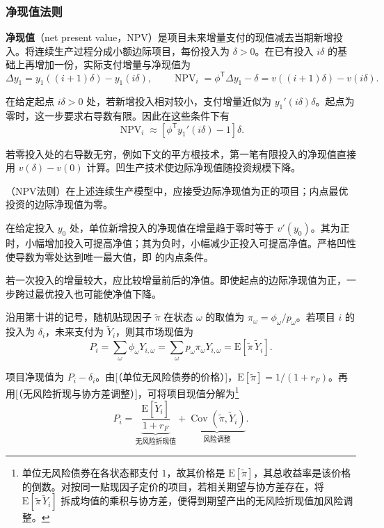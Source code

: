 \subsubsection{净现值法则}
\textbf{净现值}（net present value，NPV）是项目未来增量支付的现值减去当期新增投入。将连续生产过程分成小额边际项目，每份投入为 $\delta>0$。在已有投入 $i\delta$ 的基础上再增加一份，实际支付增量与净现值为
\[
 \Delta y_1=y_1((i+1)\delta)-y_1(i\delta),\qquad
 \operatorname{NPV}_i=\phi^{\mathsf T}\Delta y_1-\delta
 =v((i+1)\delta)-v(i\delta).
\]

在给定起点 $i\delta>0$ 处，若新增投入相对较小，支付增量近似为 $y_1'(i\delta)\delta$。起点为零时，这一步要求右导数有限。因此在这些条件下有
\[
 \operatorname{NPV}_i\approx\left[\phi^{\mathsf T}y_1'(i\delta)-1\right]\delta.
\]

若零投入处的右导数无穷，例如下文的平方根技术，第一笔有限投入的净现值直接用 $v(\delta)-v(0)$ 计算。凹生产技术使边际净现值随投资规模下降。
\begin{tcolorbox}[knowledge]
（NPV法则）在上述连续生产模型中，应接受边际净现值为正的项目；内点最优投资的边际净现值为零。
\end{tcolorbox}

\begin{solution}[label-content={证明},blank-type=none]
在给定投入 $y_0$ 处，单位新增投入的净现值在增量趋于零时等于 $v'(y_0)$。其为正时，小幅增加投入可提高净值；其为负时，小幅减少正投入可提高净值。严格凹性使导数为零处达到唯一最大值，即 的内点条件。
\end{solution}

若一次投入的增量较大，应比较增量前后的净值。即使起点的边际净现值为正，一步跨过最优投入也可能使净值下降。

沿用第十讲的记号，随机贴现因子 $\widetilde\pi$ 在状态 $\omega$ 的取值为 $\pi_\omega=\phi_\omega/p_\omega$。若项目 $i$ 的投入为 $\delta_i$，未来支付为 $\widetilde Y_i$，则其市场现值为
\[
 P_i=\sum_\omega\phi_\omega Y_{i,\omega}
    =\sum_\omega p_\omega\pi_\omega Y_{i,\omega}
    =\mathrm E[\widetilde\pi\,\widetilde Y_i].
\]

项目净现值为 $P_i-\delta_i$。由[（单位无风险债券的价格）]，$\mathrm E[\widetilde\pi]=1/(1+r_F)$。再用[（无风险折现与协方差调整）]，可将项目现值分解为\footnote{单位无风险债券在各状态都支付 $1$，故其价格是 $\mathrm E[\widetilde\pi]$，其总收益率是该价格的倒数。对按同一贴现因子定价的项目，若相关期望与协方差存在，将 $\mathrm E[\widetilde\pi\,\widetilde Y_i]$ 拆成均值的乘积与协方差，便得到期望产出的无风险折现值加风险调整。}
\[
 P_i=\underbrace{\frac{\mathrm E[\widetilde Y_i]}{1+r_F}}_{\text{无风险折现值}}
     +\underbrace{\operatorname{Cov}(\widetilde\pi,\widetilde Y_i)}_{\text{风险调整}}.
\]

